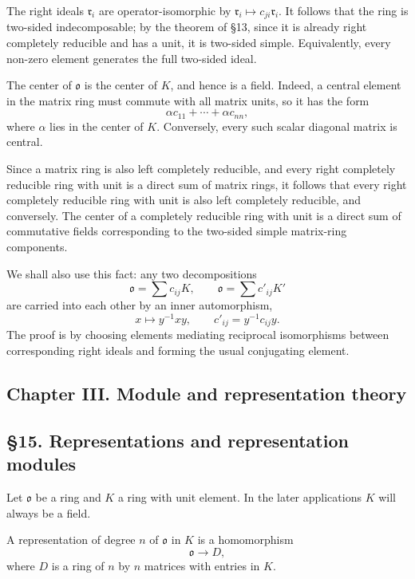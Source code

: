 \documentclass[11pt]{article}
\begin{document}
The right ideals \(\mathfrak r_i\) are operator-isomorphic by
\(\mathfrak r_i\mapsto c_{ji}\mathfrak r_i\). It follows that the ring
is two-sided indecomposable; by the theorem of §13, since it is already
right completely reducible and has a unit, it is two-sided simple.
Equivalently, every non-zero element generates the full two-sided ideal.

The center of \(\mathfrak{o}\) is the center of \(K\), and hence is a
field. Indeed, a central element in the matrix ring must commute with
all matrix units, so it has the form \[
  \alpha c_{11}+\cdots+\alpha c_{nn},
\] where \(\alpha\) lies in the center of \(K\). Conversely, every such
scalar diagonal matrix is central.

Since a matrix ring is also left completely reducible, and every right
completely reducible ring with unit is a direct sum of matrix rings, it
follows that every right completely reducible ring with unit is also
left completely reducible, and conversely. The center of a completely
reducible ring with unit is a direct sum of commutative fields
corresponding to the two-sided simple matrix-ring components.

We shall also use this fact: any two decompositions \[
  \mathfrak{o}=\sum c_{ij}K,
  \qquad
  \mathfrak{o}=\sum c'_{ij}K'
\] are carried into each other by an inner automorphism, \[
  x\mapsto y^{-1}xy,
  \qquad
  c'_{ij}=y^{-1}c_{ij}y.
\] The proof is by choosing elements mediating reciprocal isomorphisms
between corresponding right ideals and forming the usual conjugating
element.

\subsection{Chapter III. Module and representation
theory}\label{chapter-iii.-module-and-representation-theory}

\subsection{§15. Representations and representation
modules}\label{representations-and-representation-modules}

Let \(\mathfrak{o}\) be a ring and \(K\) a ring with unit element. In
the later applications \(K\) will always be a field.

A representation of degree \(n\) of \(\mathfrak{o}\) in \(K\) is a
homomorphism \[
  \mathfrak{o}\to D,
\] where \(D\) is a ring of \(n\) by \(n\) matrices with entries in
\(K\).
\end{document}
